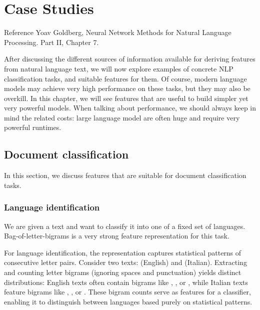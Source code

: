 \chapter{Case Studies}

\begin{note}{Reference}
    Yoav Goldberg, Neural Network Methods for Natural Language Processing.\cite{goldberg2017neural}
    Part II, Chapter 7.
\end{note}

After discussing the different sources of information available for deriving features from natural language text, we will now explore examples of concrete NLP classification tasks, and suitable features for them.
Of course, modern language models may achieve very high performance on these tasks, but they may also be overkill. In this chapter, we will see features that are useful to build simpler yet very powerful models.
When talking about performance, we should always keep in mind the related costs: large language model are often huge and require very powerful runtimes.

\section{Document classification}
In this section, we discuss features that are suitable for document classification tasks.

\subsection{Language identification}
We are given a text and want to classify it into one of a fixed set of languages. Bag-of-letter-bigrams is a very strong feature representation for this task.

\begin{example}{}
    For language identification, the  representation captures statistical patterns of consecutive letter pairs. Consider two texts:  (English) and  (Italian).
    Extracting and counting letter bigrams (ignoring spaces and punctuation) yields distinct distributions: English texts often contain bigrams like , , or , while Italian texts feature bigrams like , , or . These bigram counts serve as features for a classifier, enabling it to distinguish between languages based purely on statistical patterns.
\end{example}

